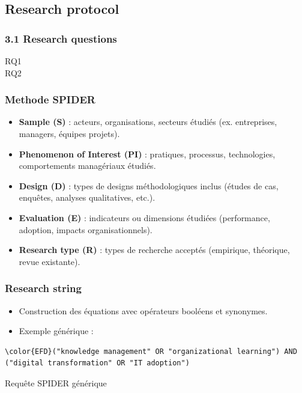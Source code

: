 \documentclass[a4paper,12pt]{article}
\begin{document}
\subsection{Research protocol}
\label{sec:org013456f}
\subsubsection{3.1 Research questions}
\label{sec:org733dedc}
\begin{description}
\item[{RQ1}] 

\item[{RQ2}] 
\end{description}
\subsubsection{Methode SPIDER}
\label{sec:orga5c046f}
\begin{itemize}
\item \textbf{\textbf{Sample (S)}} : acteurs, organisations, secteurs étudiés (ex. entreprises, managers, équipes projets).
\item \textbf{\textbf{Phenomenon of Interest (PI)}} : pratiques, processus, technologies, comportements managériaux étudiés.
\item \textbf{\textbf{Design (D)}} : types de designs méthodologiques inclus (études de cas, enquêtes, analyses qualitatives, etc.).
\item \textbf{\textbf{Evaluation (E)}} : indicateurs ou dimensions étudiées (performance, adoption, impacts organisationnels).
\item \textbf{\textbf{Research type (R)}} : types de recherche acceptés (empirique, théorique, revue existante).
\end{itemize}
\subsubsection{Research string}
\label{sec:orgd6904d0}
\begin{itemize}
\item Construction des équations avec opérateurs booléens et synonymes.
\item Exemple générique :
\end{itemize}

\begin{listing}[htbp]
\begin{Code}
\begin{Verbatim}
\color{EFD}("knowledge management" OR "organizational learning") AND ("digital transformation" OR "IT adoption")
\end{Verbatim}
\end{Code}
\caption{Requête SPIDER générique}
\end{listing}
\end{document}
